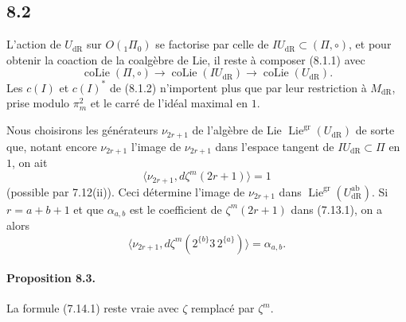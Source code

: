 \documentclass[10pt]{article}
\newcommand{\Lie}{\operatorname{Lie}}
\newcommand{\dR}{\mathrm{dR}}
\begin{document}
\subsection*{8.2}
L'action de $U_{\dR}$ sur $O({}_1\Pi_0)$ se factorise par celle de $IU_{\dR}\subset(\Pi,\circ)$, et pour obtenir la coaction de la coalgèbre de Lie, il reste à composer (8.1.1) avec
\[
\operatorname{coLie}(\Pi,\circ)\longrightarrow\operatorname{coLie}(IU_{\dR})\longrightarrow\operatorname{coLie}(U_{\dR}).
\]
Les $c(I)$ et $c(I)^*$ de (8.1.2) n'importent plus que par leur restriction à $M_{\dR}$, prise modulo $\pi_m^2$ et le carré de l'idéal maximal en $1$.

Nous choisirons les générateurs $\nu_{2r+1}$ de l'algèbre de Lie $\Lie^{\mathrm{gr}}(U_{\dR})$ de sorte que, notant encore $\nu_{2r+1}$ l'image de $\nu_{2r+1}$ dans l'espace tangent de $IU_{\dR}\subset\Pi$ en $1$, on ait
\[
\langle\nu_{2r+1},d\zeta^m(2r+1)\rangle=1
\]
(possible par 7.12(ii)). Ceci détermine l'image de $\nu_{2r+1}$ dans $\Lie^{\mathrm{gr}}(U_{\dR}^{\mathrm{ab}})$. Si $r=a+b+1$ et que $\alpha_{a,b}$ est le coefficient de $\zeta^m(2r+1)$ dans (7.13.1), on a alors
\[
\langle\nu_{2r+1},d\zeta^m(2^{\{b\}}3\,2^{\{a\}})\rangle=\alpha_{a,b}.
\]

\paragraph{Proposition 8.3.}
La formule (7.14.1) reste vraie avec $\zeta$ remplacé par $\zeta^m$.
\end{document}
